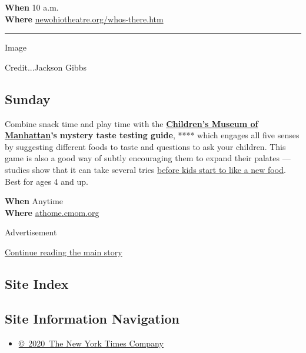 \textbf{When} 10 a.m.\\
\textbf{Where}
\href{http://newohiotheatre.org/whos-there.htm}{newohiotheatre.org/whos-there.htm}

\begin{center}\rule{0.5\linewidth}{\linethickness}\end{center}

Image

Credit...Jackson Gibbs

\hypertarget{sunday}{%
\subsection{Sunday}\label{sunday}}

Combine snack time and play time with the
\textbf{\href{https://cmom.org/}{Children's Museum of Manhattan}'s}
\textbf{mystery taste testing guide}, **** which engages all five senses
by suggesting different foods to taste and questions to ask your
children. This game is also a good way of subtly encouraging them to
expand their palates --- studies show that it can take several tries
\href{https://www.nytimes3xbfgragh.onion/article/kids-healthy-eating-habits.html}{before
kids start to like a new food}. Best for ages 4 and up.

\textbf{When} Anytime\\
\textbf{Where}
\href{https://athome.cmom.org/mystery-taste-testing-and-movement-game/}{athome.cmom.org}

Advertisement

\protect\hyperlink{after-bottom}{Continue reading the main story}

\hypertarget{site-index}{%
\subsection{Site Index}\label{site-index}}

\hypertarget{site-information-navigation}{%
\subsection{Site Information
Navigation}\label{site-information-navigation}}

\begin{itemize}
\tightlist
\item
  \href{https://help.nytimes3xbfgragh.onion/hc/en-us/articles/115014792127-Copyright-notice}{©~2020~The
  New York Times Company}
\end{itemize}

